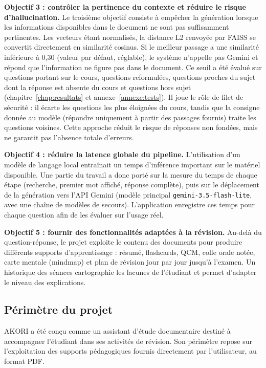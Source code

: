 \documentclass[12pt,a4paper,oneside]{report}
\begin{document}
\textbf{Objectif 3 : contrôler la pertinence du contexte et réduire le risque d'hallucination.}
Le troisième objectif consiste à empêcher la génération lorsque les informations disponibles dans le document ne sont pas suffisamment pertinentes. Les vecteurs étant normalisés, la distance L2 renvoyée par FAISS se convertit directement en similarité cosinus. Si le meilleur passage a une similarité inférieure à 0,30 (valeur par défaut, réglable), le système n'appelle pas Gemini et répond que l'information ne figure pas dans le document. Ce seuil a été évalué sur \SeuilCoursN{} questions portant sur le cours, \SeuilRefoN{} questions reformulées, \SeuilAbsN{} questions proches du sujet dont la réponse est absente du cours et \SeuilHorsN{} questions hors sujet (chapitre~\ref{chap:resultats} et annexe~\ref{annexe:tests}). Il joue le rôle de filet de sécurité : il écarte les questions les plus éloignées du cours, tandis que la consigne donnée au modèle (répondre uniquement à partir des passages fournis) traite les questions voisines. Cette approche réduit le risque de réponses non fondées, mais ne garantit pas l'absence totale d'erreurs.

\textbf{Objectif 4 : réduire la latence globale du pipeline.}
L'utilisation d'un modèle de langage local entraînait un temps d'inférence important sur le matériel disponible. Une partie du travail a donc porté sur la mesure du temps de chaque étape (recherche, premier mot affiché, réponse complète), puis sur le déplacement de la génération vers l'API Gemini (modèle principal \texttt{gemini-3.5-flash-lite}, avec une chaîne de modèles de secours). L'application enregistre ces temps pour chaque question afin de les évaluer sur l'usage réel.

\textbf{Objectif 5 : fournir des fonctionnalités adaptées à la révision.}
Au-delà du question-réponse, le projet exploite le contenu des documents pour produire différents supports d'apprentissage : résumé, flashcards, QCM, colle orale notée, carte mentale (mindmap) et plan de révision jour par jour jusqu'à l'examen. Un historique des séances cartographie les lacunes de l'étudiant et permet d'adapter le niveau des explications.

\subsection{Périmètre du projet}

AKORI a été conçu comme un assistant d'étude documentaire destiné à accompagner l'étudiant dans ses activités de révision. Son périmètre repose sur l'exploitation des supports pédagogiques fournis directement par l'utilisateur, au format PDF.
\end{document}
